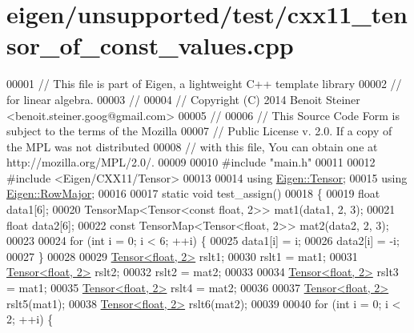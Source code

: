 \hypertarget{eigen_2unsupported_2test_2cxx11__tensor__of__const__values_8cpp_source}{}\section{eigen/unsupported/test/cxx11\+\_\+tensor\+\_\+of\+\_\+const\+\_\+values.cpp}
\label{eigen_2unsupported_2test_2cxx11__tensor__of__const__values_8cpp_source}

\begin{DoxyCode}
00001 \textcolor{comment}{// This file is part of Eigen, a lightweight C++ template library}
00002 \textcolor{comment}{// for linear algebra.}
00003 \textcolor{comment}{//}
00004 \textcolor{comment}{// Copyright (C) 2014 Benoit Steiner <benoit.steiner.goog@gmail.com>}
00005 \textcolor{comment}{//}
00006 \textcolor{comment}{// This Source Code Form is subject to the terms of the Mozilla}
00007 \textcolor{comment}{// Public License v. 2.0. If a copy of the MPL was not distributed}
00008 \textcolor{comment}{// with this file, You can obtain one at http://mozilla.org/MPL/2.0/.}
00009 
00010 \textcolor{preprocessor}{#include "main.h"}
00011 
00012 \textcolor{preprocessor}{#include <Eigen/CXX11/Tensor>}
00013 
00014 \textcolor{keyword}{using} \hyperlink{class_eigen_1_1_tensor}{Eigen::Tensor};
00015 \textcolor{keyword}{using} \hyperlink{group__enums_ggaacded1a18ae58b0f554751f6cdf9eb13acfcde9cd8677c5f7caf6bd603666aae3}{Eigen::RowMajor};
00016 
00017 \textcolor{keyword}{static} \textcolor{keywordtype}{void} test\_assign()
00018 \{
00019   \textcolor{keywordtype}{float} data1[6];
00020   TensorMap<Tensor<const float, 2>> mat1(data1, 2, 3);
00021   \textcolor{keywordtype}{float} data2[6];
00022   \textcolor{keyword}{const} TensorMap<Tensor<float, 2>> mat2(data2, 2, 3);
00023 
00024   \textcolor{keywordflow}{for} (\textcolor{keywordtype}{int} i = 0; i < 6; ++i) \{
00025     data1[i] = i;
00026     data2[i] = -i;
00027   \}
00028 
00029   \hyperlink{class_eigen_1_1_tensor}{Tensor<float, 2>} rslt1;
00030   rslt1 = mat1;
00031   \hyperlink{class_eigen_1_1_tensor}{Tensor<float, 2>} rslt2;
00032   rslt2 = mat2;
00033 
00034   \hyperlink{class_eigen_1_1_tensor}{Tensor<float, 2>} rslt3 = mat1;
00035   \hyperlink{class_eigen_1_1_tensor}{Tensor<float, 2>} rslt4 = mat2;
00036 
00037   \hyperlink{class_eigen_1_1_tensor}{Tensor<float, 2>} rslt5(mat1);
00038   \hyperlink{class_eigen_1_1_tensor}{Tensor<float, 2>} rslt6(mat2);
00039 
00040   \textcolor{keywordflow}{for} (\textcolor{keywordtype}{int} i = 0; i < 2; ++i) \{

\end{DoxyCode}

